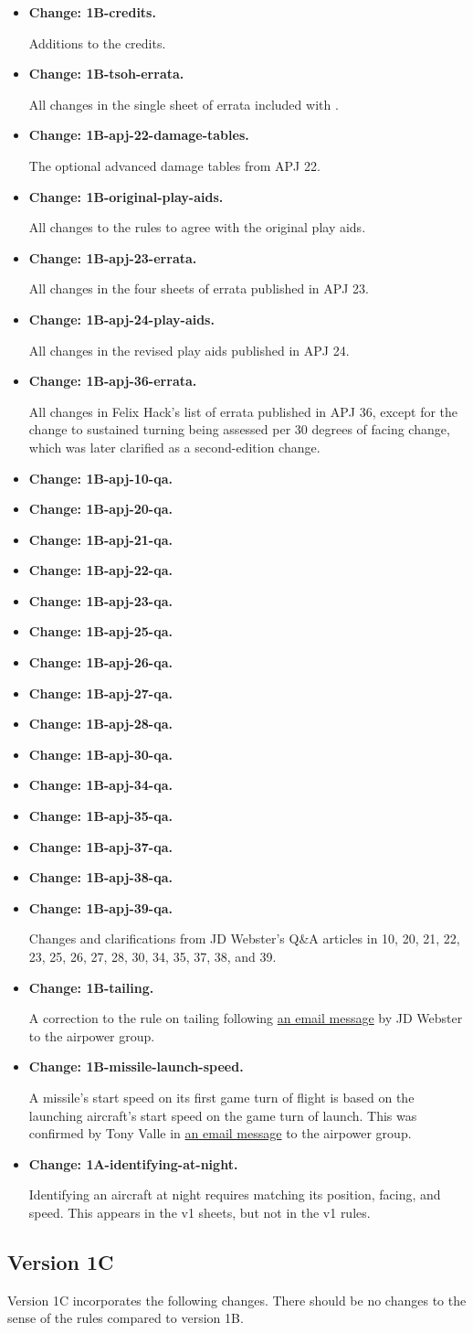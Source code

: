 \documentclass[10pt]{report}
\newcommand{\itemtag}[1]{\item \textbf{Change: #1.}\par}
\begin{document}
\begin{itemize}
    \itemtag{1B-credits} Additions to the credits.
    \itemtag{1B-tsoh-errata} All changes in the single sheet of errata included with {\TSOH}.
    \itemtag{1B-apj-22-damage-tables} The optional advanced damage tables from APJ 22.
    \itemtag{1B-original-play-aids} All changes to the rules to agree with the original play aids.
    \itemtag{1B-apj-23-errata} All changes in the four sheets of errata published in APJ 23.
    \itemtag{1B-apj-24-play-aids} All changes in the revised play aids published in APJ 24. 
    \itemtag{1B-apj-36-errata} All changes in Felix Hack’s list of errata published in APJ 36, except for the change to sustained turning being assessed per 30 degrees of facing change, which was later clarified as a second-edition change.
    \itemtag{1B-apj-10-qa} 
    \itemtag{1B-apj-20-qa} 
    \itemtag{1B-apj-21-qa} 
    \itemtag{1B-apj-22-qa} 
    \itemtag{1B-apj-23-qa} 
    \itemtag{1B-apj-25-qa} 
    \itemtag{1B-apj-26-qa} 
    \itemtag{1B-apj-27-qa} 
    \itemtag{1B-apj-28-qa} 
    \itemtag{1B-apj-30-qa} 
    \itemtag{1B-apj-34-qa} 
    \itemtag{1B-apj-35-qa} 
    \itemtag{1B-apj-37-qa} 
    \itemtag{1B-apj-38-qa} 
    \itemtag{1B-apj-39-qa} 
    Changes and clarifications from JD Webster’s Q\&A articles in {\APJ} 10, 20, 21, 22, 23, 25, 26, 27, 28, 30, 34, 35, 37, 38, and 39.
    \itemtag{1B-tailing} A correction to the rule on tailing following \href{https://airpower.groups.io/g/main/message/2847}{an email message} by JD Webster to the airpower group. 
    \itemtag{1B-missile-launch-speed} A missile's start speed on its first game turn of flight is based on the launching aircraft's start speed on the game turn of launch. This was confirmed by Tony Valle in \href{https://airpower.groups.io/g/main/message/3104}{an email message} to the airpower group.    
    \itemtag{1A-identifying-at-night} Identifying an aircraft at night requires matching its position, facing, and speed. This appears in the v1 sheets, but not in the v1 rules.
\end{itemize}

\subsection{Version 1C}

Version 1C incorporates the following changes. There should be no changes to the sense of the rules compared to version 1B.
\end{document}
